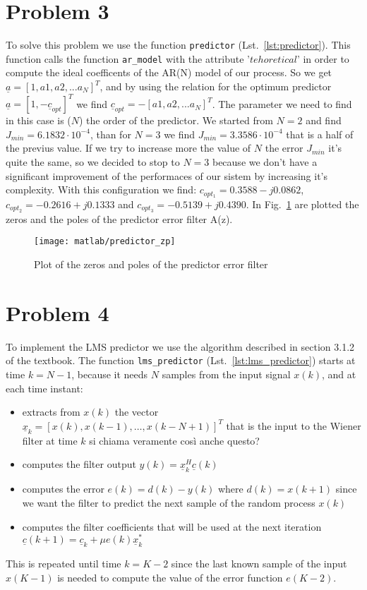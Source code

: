 \documentclass{article}
\newcommand{\inlinecode}[1]{\lstinline[basicstyle=\ttfamily,
    keywordstyle={}]{#1}}
\renewcommand{\vec}[1]{\underline{#1}}
\begin{document}
\section*{Problem 3}
To solve this problem we use the function \inlinecode{predictor} (Lst.~\ref{lst:predictor}). This function calls the function \inlinecode{ar_model} with the attribute '$tehoretical$' in order to compute the ideal coefficents of the AR(N) model of our process. So we get $ \vec{a} = [1, a1, a2,...a_N]^T $, and by using the relation for the optimum predictor $ \vec{a} = [1,-\vec{c}_{opt}]^T $ we find $ \vec{c}_{opt} = -[a1, a2,...a_N]^T$. The parameter we need to find in this case is ($N$) the order of the predictor. We started from $N=2$ and find $J_{min} = 6.1832\cdot10^{-4}$, than for $N=3$ we find $J_{min} = 3.3586\cdot10^{-4}$ that is a half of the previus value. If we try to increase more the value of $N$ the error $J_{min}$ it's quite the same, so we decided to stop to $N=3$ because we don't have a significant improvement of the performaces of our sistem by increasing it's complexity.
With this configuration we find: $c_{opt_1} = 0.3588 -j0.0862$,  $c_{opt_2} = -0.2616 +j0.1333$ and $c_{opt_3} = -0.5139 +j0.4390$.
\newline In Fig.~\ref{plot:predictor_zp} are plotted the zeros and the poles of the predictor error filter A(z). 
\begin{figure}[htbp]
  \centering
  \texttt{[image: matlab/predictor\_zp]}
  \caption{Plot of the zeros and poles of the predictor error filter}
  \label{plot:predictor_zp}
\end{figure}

\section*{Problem 4}
To implement the LMS predictor we use the algorithm described in
section 3.1.2 of the textbook. The function \inlinecode{lms_predictor}
(Lst.~\ref{lst:lms_predictor}) starts at time $k=N-1$, because it
needs $N$ samples from the input signal $x(k)$, and at each
time instant:
\begin{itemize}
  \item extracts from $x(k)$ the vector $\vec{x}_k = [x(k),
    x(k-1),\dots,x(k-N+1)]^T$ that is the input to the Wiener filter
    at time $k$ {\color{red} si chiama veramente così anche questo?}
  \item computes the filter output $y(k) = \vec{x}_k^H\vec{c}(k)$
  \item computes the error $e(k) = d(k) - y(k)$ where $d(k) = x(k+1)$
    since we want the filter to predict the next sample of the random
    process $x(k)$
  \item computes the filter coefficients that will be used at the next
    iteration $\vec{c}(k+1) = \vec{c}_k + \mu e(k) \vec{x}_k^*$
\end{itemize}
This is repeated until time $k = K - 2$ since the last known sample of
the input $x(K-1)$ is needed to compute the value of the error
function $e(K-2)$.
\end{document}
